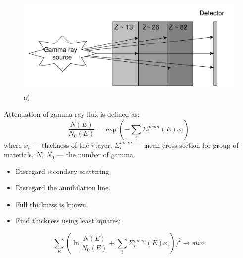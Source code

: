\documentclass[a4paper]{panl}
\begin{document}
\begin{figure}[t]
    \begin{center}
        \includegraphics[width=120mm]{figures/yed_schema_2.pdf}  
        \vspace{-3mm}
        \caption{a) }
    \end{center}
    \vspace{-5mm}
\end{figure}
                Attenuation of gamma ray flux is defined as:
$$
\frac{N(E)}{N_0(E)} = \exp(-\sum_i \Sigma^{mean}_i(E)x_i)
$$
where $x_i$ --- thickness of the $i$-layer, $\Sigma^{mean}_i$ --- mean cross-section for group of materials, $N,~N_0$ --- the number of gamma.
\begin{itemize}
    \item Disregard secondary scattering.
    \item Disregard the annihilation line.
\end{itemize}

                    \begin{itemize}
    \item Full thickness is known.
    \item Find thickness using least squares:                  
    
\end{itemize}
$$
\sum_E(\ln \frac{N(E)}{N_0(E)} + \sum_i \Sigma^{mean}_i(E)x_i))^2 \to min
$$
\end{document}
